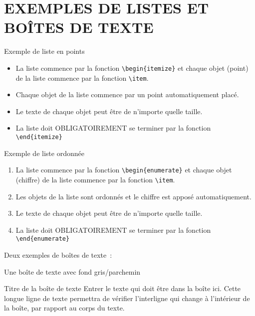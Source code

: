\chapter{EXEMPLES DE LISTES ET BOÎTES DE TEXTE}

Exemple de liste en points
\begin{itemize}
  \item La liste commence par la fonction \verb|\begin{itemize}| et chaque objet (point) de la liste commence par la fonction \verb|\item|.
  \item Chaque objet de la liste commence par un point automatiquement placé.
  \item Le texte de chaque objet peut être de n'importe quelle taille.
  \item La liste doit OBLIGATOIREMENT se terminer par la fonction \verb|\end{itemize}|
\end{itemize}


Exemple de liste ordonnée
\begin{enumerate}
  \item La liste commence par la fonction \verb|\begin{enumerate}| et chaque objet (chiffre) de la liste commence par la fonction \verb|\item|.
  \item Les objets de la liste sont ordonnés et le chiffre est apposé automatiquement.
  \item Le texte de chaque objet peut être de n'importe quelle taille.
  \item La liste doit OBLIGATOIREMENT se terminer par la fonction \verb|\end{enumerate}|
\end{enumerate}


Deux exemples de boîtes de texte :

Une boîte de texte avec fond gris/parchemin

\begin{textbox_parchemin}{Titre de la boîte de texte}
    Entrer le texte qui doit être dans la boîte ici. Cette longue ligne de texte permettra de vérifier l'interligne qui change à l'intérieur de la boîte, par rapport au corps du texte.
\end{textbox_parchemin}

